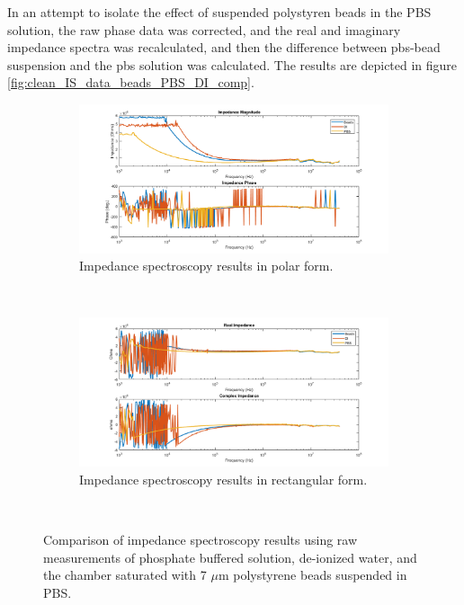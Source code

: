 \par In an attempt to isolate the effect of suspended polystyren beads in the PBS solution, the raw phase data was corrected, and the real and imaginary impedance spectra was recalculated, and then the difference between pbs-bead suspension and the pbs solution was calculated. The results are depicted in figure \ref{fig:clean_IS_data_beads_PBS_DI_comp}.

\begin{figure}[h]
    \centering
    \begin{subfigure}[b]{\textwidth}
        \centering
        \includegraphics[width=\textwidth]{images/raw_IS_data_mag_phase.png}
        \caption{Impedance spectroscopy results in polar form.}
    \end{subfigure}
    \\
    \vspace{0.1 in}
    \begin{subfigure}[b]{\textwidth}
        \centering
        \includegraphics[width=\textwidth]{images/raw_IS_data_real_imag.png}
        \caption{Impedance spectroscopy results in rectangular form.}
    \end{subfigure}
    \\
    \caption[PBS, DI, microbead IS Raw data comparison.]{Comparison of impedance spectroscopy results using raw measurements of phosphate buffered solution, de-ionized water, and the chamber saturated with 7 $\mu$m polystyrene beads suspended in PBS.}
    \label{fig:IS_data_beads_pbs_DI_comp}
\end{figure}

